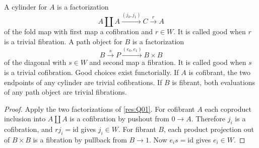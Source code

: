 \begin{proposition}\label{res:Q02}
A cylinder for \(A\) is a factorization
\[
 A\amalg A\xrightarrow{(j_0,j_1)} C\xrightarrow{r}A
\]
of the fold map with first map a cofibration and \(r\in W\).
It is called good when \(r\) is a trivial fibration.
A path object for \(B\) is a factorization
\[
 B\xrightarrow{s} P\xrightarrow{(e_0,e_1)}B\times B
\]
of the diagonal with \(s\in W\) and second map a fibration.
It is called good when \(s\) is a trivial cofibration.
Good choices exist functorially. If \(A\) is cofibrant, the
two endpoints of any cylinder are trivial cofibrations. If \(B\)
is fibrant, both evaluations of any path object are trivial
fibrations.
\end{proposition}
\begin{proof}
Apply the two factorizations of \ref{res:Q01}. For cofibrant \(A\)
each coproduct inclusion into \(A\amalg A\) is a cofibration by
pushout from \(0\to A\). Therefore \(j_i\) is a cofibration,
and \(rj_i=\mathrm{id}\) gives \(j_i\in W\). For fibrant \(B\),
each product projection out of \(B\times B\) is a fibration
by pullback from \(B\to1\). Now \(e_i s=\mathrm{id}\) gives
\(e_i\in W\).
\end{proof}

